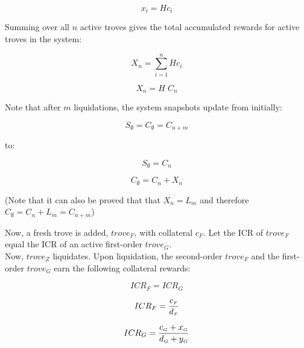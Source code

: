 \documentclass[reqno]{article}
\begin{document}
\begin{equation} \label{eq:45}
    x_i=Hc_i
\end{equation}

\bigskip
Summing over all $n$ active troves gives the total accumulated rewards for active troves in the system:

\begin{equation} 
    X_n=\sum\limits^n_{i=1}Hc_i
\end{equation}

\begin{equation} \label{eq:47}
    X_n=H \; C_n
\end{equation}

\bigskip
Note that after $m$ liquidations, the system snapshots update from initially:

\begin{equation}
    S_\emptyset = C_\emptyset = C_{n+m}
\end{equation}

to:

\begin{equation} \label{eq:8}
    S_\emptyset=C_n
\end{equation}

\begin{equation} \label{eq:9}
    C_\emptyset=C_n+X_n
\end{equation}

\bigskip
(Note that it can also be proved that that $X_n=L_m$ and therefore $C_\emptyset=C_n+L_m=C_{n+m}$)

\bigskip
Now, a fresh trove is added, $trove_F$, with collateral $c_F$.  Let the ICR of $trove_F$ equal the ICR of an active first-order $trove_G$.\\

Now, $trove_Z$ liquidates. Upon liquidation, the second-order $trove_F$ and the first-order $trove_G$ earn the following collateral rewards:

\begin{equation} \label{eq:10}
    ICR_F=ICR_G
\end{equation}

\begin{equation} 
    ICR_F=\frac{c_\mathsmaller{F}}{d_\mathsmaller{F}}
\end{equation}

\begin{equation} 
    ICR_G=\frac{c_\mathsmaller{G}+x_\mathsmaller{G}}{d_\mathsmaller{G}+y_\mathsmaller{G}}
\end{equation}
\end{document}
